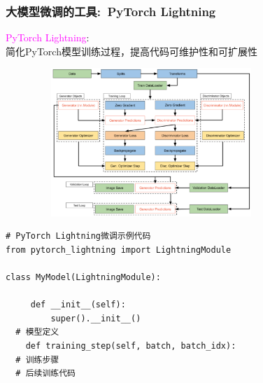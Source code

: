 \begin{frame}
    \frametitle{大模型微调的工具:~\textrm{PyTorch Lightning}}
    \textcolor{magenta}{\textrm{PyTorch Lightning}}:\\
    简化\textrm{PyTorch}模型训练过程，提高代码可维护性和可扩展性
\begin{figure}[h!]
\vspace*{-0.05in}
\centering
\includegraphics[height=2.2in, width=3.5in, viewport=0 0 590 404,clip]{Figures/Pytorch_Lightning_GAN.png}
\label{Pytorch_Lightning_GAN}
\end{figure}
            \begin{lstlisting}[style=pythonstyle]
# PyTorch Lightning微调示例代码
from pytorch_lightning import LightningModule

class MyModel(LightningModule):

     def __init__(self):
         super().__init__()
  # 模型定义
    def training_step(self, batch, batch_idx):
  # 训练步骤
  # 后续训练代码
            \end{lstlisting}
\end{frame}

